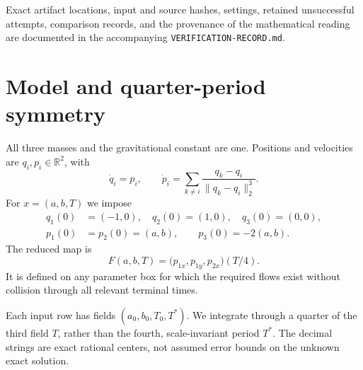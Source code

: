 \documentclass[10pt,a4paper]{article}
\theoremstyle{remark}
\newcommand{\R}{\mathbb R}
\begin{document}
Exact artifact locations, input and source hashes, settings, retained
unsuccessful attempts, comparison records, and the provenance of the
mathematical reading are documented in the accompanying
\texttt{VERIFICATION-RECORD.md}.

\section{Model and quarter-period symmetry}
\label{sec:model}
All three masses and the gravitational constant are one. Positions and
velocities are $q_i,p_i\in\R^2$, with
\begin{equation}
 \dot q_i=p_i,\qquad
 \dot p_i=\sum_{k\ne i}\frac{q_k-q_i}{\lVert q_k-q_i\rVert_2^3}.
 \label{eq:newton}
\end{equation}
For $x=(a,b,T)$ we impose
\begin{equation}
 \begin{split}
 q_1(0)&=(-1,0),\quad q_2(0)=(1,0),\quad q_3(0)=(0,0),\\
 p_1(0)&=p_2(0)=(a,b),\qquad p_3(0)=-2(a,b).
 \end{split}
 \label{eq:initial}
\end{equation}
The reduced map is
\begin{equation}
 F(a,b,T)=\bigl(p_{1x},p_{1y},p_{2x}\bigr)(T/4).
 \label{eq:F}
\end{equation}
It is defined on any parameter box for which the required flows exist
without collision through all relevant terminal times.

Each input row has fields $(a_0,b_0,T_0,T^*)$. We integrate through a
quarter of the third field $T$, rather than the fourth, scale-invariant
period $T^*$. The decimal strings are exact rational centers, not assumed
error bounds on the unknown exact solution.
\end{document}
